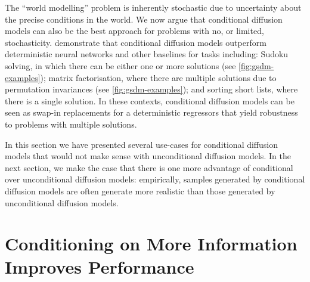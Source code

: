 The ``world modelling'' problem is inherently stochastic due to uncertainty about the precise conditions in the world. We now argue that conditional diffusion models can also be the best approach for problems with no, or limited, stochasticity. \citet{weilbach2023graphically,weilbach2023scaling} demonstrate that conditional diffusion models outperform deterministic neural networks and other baselines for tasks including: Sudoku solving, in which there can be either one or more solutions (see \cref{fig:gsdm-examples}); matrix factorisation, where there are multiple solutions due to permutation invariances (see \cref{fig:gsdm-examples}); and sorting short lists, where there is a single solution. In these contexts, conditional diffusion models can be seen as swap-in replacements for a deterministic regressors that yield robustness to problems with multiple solutions.

In this section we have presented several use-cases for conditional diffusion models that would not make sense with unconditional diffusion models. In the next section, we make the case that there is one more advantage of conditional over unconditional diffusion models: empirically, samples generated by conditional diffusion models are often generate more realistic than those generated by unconditional diffusion models.

\section{Conditioning on More Information Improves Performance} \label{sec:conditioning-on-more-improves-performance}

